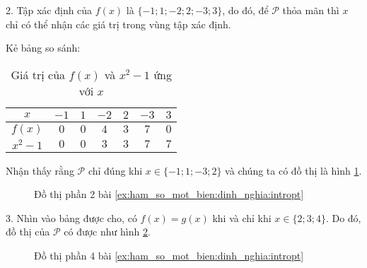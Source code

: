 {
   \begin{minipageindent}{0.48\textwidth}
      2. Tập xác định của $f(x)$ là $\{-1; 1; -2; 2; -3; 3\}$, do đó, để $\mathcal{P}$ thỏa mãn thì $x$ chỉ có thể nhận các giá trị trong vùng tập xác định.

      Kẻ bảng so sánh:
      \begin{table}[H]
         \centering
         \begin{tabular}{|c|c|c|c|c|c|c|}
            \hline
            $x$ & $-1$ & $1$ & $-2$ & $2$ & $-3$ & $3$\\
            \hline
            $f(x)$ & $0$ & $0$ & $4$ & $3$ & $7$ & $0$\\
            \hline
            $x^2-1$ & $0$ & $0$ & $3$ & $3$ & $7$ & $7$\\
            \hline
         \end{tabular}
         \caption{Giá trị của $f(x)$ và $x^2-1$ ứng với $x$}
         \label{tab:ham_so_mot_bien:dinh_nghia:values3}
      \end{table}

      Nhận thấy rằng $\mathcal{P}$ chỉ đúng khi $x\in \{-1; 1; -3; 2\}$ và chúng ta có đồ thị là hình \ref{fig:ham_so_mot_bien:dinh_nghia:dtp2}.
   \end{minipageindent}
   \hfill
   \begin{minipageindent}{0.48\textwidth}
      \begin{figure}[H]
         \centering
         \caption{Đồ thị phần 2 bài \ref{ex:ham_so_mot_bien:dinh_nghia:intropt}}
         \label{fig:ham_so_mot_bien:dinh_nghia:dtp2}
      \end{figure}
   \end{minipageindent}
}

{
   \begin{minipageindent}{0.48\textwidth}
      3. Nhìn vào bảng được cho, có $f(x) = g(x)$ khi và chỉ khi $x\in \{2; 3; 4\}$. Do đó, đồ thị của $\mathcal{P}$ có được như hình \ref{fig:ham_so_mot_bien:dinh_nghia:dtp3}.
   \end{minipageindent}
   \hfill
   \begin{minipageindent}{0.48\textwidth}
      \begin{figure}[H]
         \centering
         \caption{Đồ thị phần 4 bài \ref{ex:ham_so_mot_bien:dinh_nghia:intropt}}
         \label{fig:ham_so_mot_bien:dinh_nghia:dtp3}
      \end{figure}
   \end{minipageindent}
}


